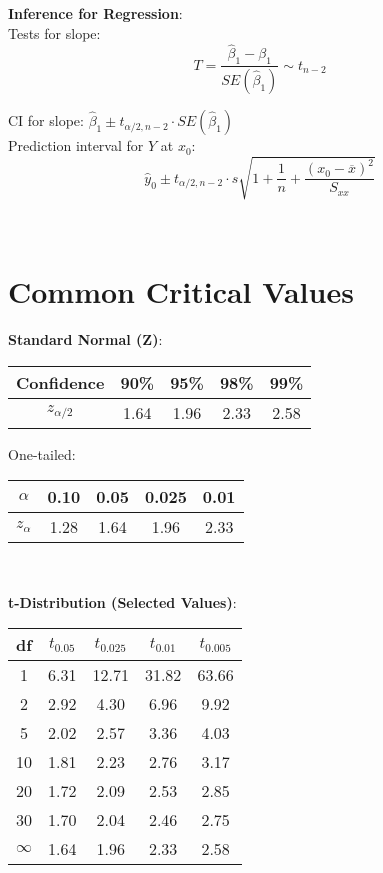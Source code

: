 \documentclass{article}
\newenvironment{cheatformula}[1][Title]{
    \begin{minipage}{\linewidth}
    \textbf{#1}:\\
}{
    \end{minipage}\\[2ex]
}
\begin{document}
\begin{multicols*}{2}
\begin{cheatformula}[Inference for Regression]
    Tests for slope:
    $$T = \frac{\hat{\beta}_1 - \beta_1}{SE(\hat{\beta}_1)} \sim t_{n-2}$$
    
    CI for slope: $\hat{\beta}_1 \pm t_{\alpha/2,n-2} \cdot SE(\hat{\beta}_1)$\\
    
    Prediction interval for $Y$ at $x_0$:
    $$\hat{y}_0 \pm t_{\alpha/2,n-2} \cdot s\sqrt{1 + \frac{1}{n} + \frac{(x_0-\overline{x})^2}{S_{xx}}}$$
\end{cheatformula}

\section{Common Critical Values}

\begin{cheatformula}[Standard Normal (Z)]
    \begin{center}
    \begin{tabular}{|c|c|c|c|c|}
    \hline
    Confidence & 90\% & 95\% & 98\% & 99\% \\
    \hline
    $z_{\alpha/2}$ & 1.64 & 1.96 & 2.33 & 2.58 \\
    \hline
    \end{tabular}
    \end{center}
    
    One-tailed:
    \begin{center}
    \begin{tabular}{|c|c|c|c|c|}
    \hline
    $\alpha$ & 0.10 & 0.05 & 0.025 & 0.01 \\
    \hline
    $z_\alpha$ & 1.28 & 1.64 & 1.96 & 2.33 \\
    \hline
    \end{tabular}
    \end{center}
\end{cheatformula}

\begin{cheatformula}[t-Distribution (Selected Values)]
    \begin{center}
    \begin{tabular}{|c|c|c|c|c|}
    \hline
    df & $t_{0.05}$ & $t_{0.025}$ & $t_{0.01}$ & $t_{0.005}$ \\
    \hline
    1 & 6.31 & 12.71 & 31.82 & 63.66 \\
    2 & 2.92 & 4.30 & 6.96 & 9.92 \\
    5 & 2.02 & 2.57 & 3.36 & 4.03 \\
    10 & 1.81 & 2.23 & 2.76 & 3.17 \\
    20 & 1.72 & 2.09 & 2.53 & 2.85 \\
    30 & 1.70 & 2.04 & 2.46 & 2.75 \\
    $\infty$ & 1.64 & 1.96 & 2.33 & 2.58 \\
    \hline
    \end{tabular}
    \end{center}
\end{cheatformula}


\end{multicols*}
\end{document}
